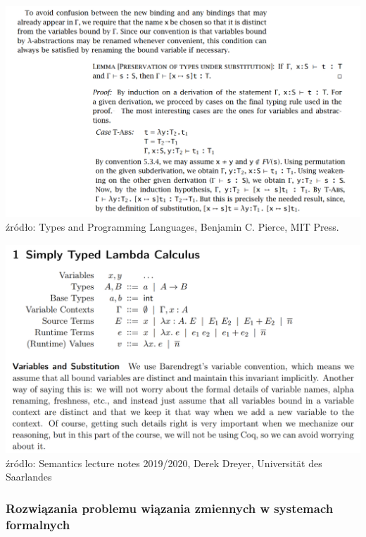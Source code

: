 \documentclass[aspectratio=169]{beamer}
\begin{document}
\begin{frame}
\includegraphics[width=\textwidth]{pierce-binding}
{\footnotesize źródło: Types and Programming Languages, Benjamin C. Pierce, MIT Press.}
\end{frame}

\begin{frame}
\includegraphics[width=\textwidth]{semantics}
{\footnotesize źródło: Semantics lecture notes 2019/2020, Derek Dreyer, Universität des Saarlandes}
\end{frame}

\begin{frame}
\frametitle{Rozwiązania problemu wiązania zmiennych w systemach formalnych}
  \begin{itemize}
  \end{itemize}
\end{frame}
\end{document}

